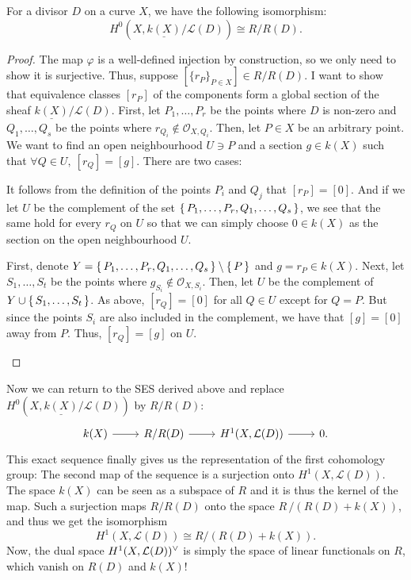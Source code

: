\begin{lemm}
  For a divisor $D$ on a curve $X$, we have the following isomorphism:
  \[
    H^{0}(X,\underline{k(X)}/\mathcal{L}(D))\cong R/R(D).
  \]
\end{lemm}
\begin{proof}
  The map $\varphi$ is a well-defined injection by construction,
  so we only need to show it is surjective. Thus,
  suppose $[\{r_{P}\}_{P\in X}]\in R/R(D)$. I want to show that equivalence
  classes $[r_{P}]$ of the components form a global section of the sheaf
  $\underline{k(X)}/\mathcal{L}(D)$. First, let $P_{1},\ldots,P_{r}$
  be the points where $D$ is non-zero and $Q_{1},\ldots,Q_{s}$ be the
  points where $r_{Q_{i}}\not\in \mathscr{O}_{X,Q_{i}}$. Then, let $P\in X$
  be an arbitrary point. We want to find an open neighbourhood $U\ni P$
  and a section $g\in k(X)$ such that $\forall Q\in U,\ [r_{Q}]=[g]$.
  There are two cases:
  \begin{description}[style=nextline]
    \item[$P\not\in\set{P_{1},\ldots,P_{r},Q_{1},\ldots,Q_{s}}\big)$]
          It follows from the definition of the points $P_{i}$ and $Q_{j}$
          that $[r_{P}]=[0]$. And if we let $U$ be the complement of
          the set $\set{P_{1},\ldots,P_{r},Q_{1},\ldots,Q_{s}}$, we see
          that the same hold for every $r_{Q}$ on $U$ so that we can simply
          choose $0\in k(X)$ as the section on the open neighbourhood $U$.
    \item[$P\in\set{P_{1},\ldots,P_{r},Q_{1},\ldots,Q_{s}}\big)$]
          First, denote $Y=\set{P_{1},\ldots,P_{r},Q_{1},\ldots,Q_{s}}
          \setminus \set{P}$ and $g=r_{P}\in k(X)$. Next, let
          $S_{1},\ldots,S_{t}$ be the points where
          $g_{S_{i}}\not\in\mathscr{O}_{X,S_{i}}$. Then, let $U$ be
          the complement of $Y\cup \set{S_{1},\ldots,S_{t}}$. As above,
          $[r_{Q}]=[0]$ for all $Q\in U$ except for $Q=P$. But since
          the points $S_{i}$ are also included in the complement, we have
          that $[g]=[0]$ away from $P$. Thus, $[r_{Q}]=[g]$ on $U$.
  \end{description}
\end{proof}
Now we can return to the SES derived above and replace
$H^{0}(X,\underline{k(X)}/\mathcal{L}(D))$ by $R/R(D)$:
\[
  \begin{tikzcd}
    k(X)\rar & R/R(D)\rar & H^{1}(X,\mathcal{L}(D))\rar & 0.
  \end{tikzcd}
\]
This exact sequence finally gives us the representation of the first
cohomology group: The second map of the sequence is a surjection
onto $H^{1}(X,\mathcal{L}(D))$. The space $k(X)$ can be seen as a subspace
of $R$ and it is thus the kernel of the map. Such a surjection maps $R/R(D)$
onto the space $R\,/\left(R(D)+k(X)\right)$, and thus we get the isomorphism
\[H^{1}(X,\mathcal{L}(D))\cong R/\left(R(D)+k(X)\right).\]
Now, the dual space $H^1(X,\mathcal{L}(D))^{\vee}$ is simply the space
of linear functionals on $R$, which vanish on $R(D)$ and $k(X)$!

